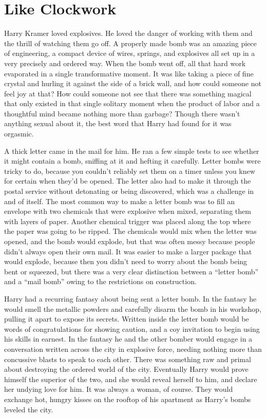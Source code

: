 \chapter{Like Clockwork}\label{like-clockwork}

Harry Kramer loved explosives. He loved the danger of working with them
and the thrill of watching them go off. A properly made bomb was an
amazing piece of engineering, a compact device of wires, springs, and
explosives all set up in a very precisely and ordered way. When the bomb
went off, all that hard work evaporated in a single transformative
moment. It was like taking a piece of fine crystal and hurling it
against the side of a brick wall, and how could someone not feel joy at
that? How could someone not see that there was something magical that
only existed in that single solitary moment when the product of labor
and a thoughtful mind became nothing more than garbage? Though there
wasn't anything sexual about it, the best word that Harry had found for
it was orgasmic.

A thick letter came in the mail for him. He ran a few simple tests to
see whether it might contain a bomb, sniffing at it and hefting it
carefully. Letter bombs were tricky to do, because you couldn't reliably
set them on a timer unless you knew for certain when they'd be opened.
The letter also had to make it through the postal service without
detonating or being discovered, which was a challenge in and of itself.
The most common way to make a letter bomb was to fill an envelope with
two chemicals that were explosive when mixed, separating them with
layers of paper. Another chemical trigger was placed along the top where
the paper was going to be ripped. The chemicals would mix when the
letter was opened, and the bomb would explode, but that was often messy
because people didn't always open their own mail. It was easier to make
a larger package that would explode, because then you didn't need to
worry about the bomb being bent or squeezed, but there was a very clear
distinction between a ``letter bomb'' and a ``mail bomb'' owing to the
restrictions on construction.

Harry had a recurring fantasy about being sent a letter bomb. In the
fantasy he would smell the metallic powders and carefully disarm the
bomb in his workshop, pulling it apart to expose its secrets. Written
inside the letter bomb would be words of congratulations for showing
caution, and a coy invitation to begin using his skills in earnest. In
the fantasy he and the other bomber would engage in a conversation
written across the city in explosive force, needing nothing more than
concussive blasts to speak to each other. There was something raw and
primal about destroying the ordered world of the city. Eventually Harry
would prove himself the superior of the two, and she would reveal
herself to him, and declare her undying love for him. It was always a
woman, of course. They would exchange hot, hungry kisses on the rooftop
of his apartment as Harry's bombs leveled the city.

